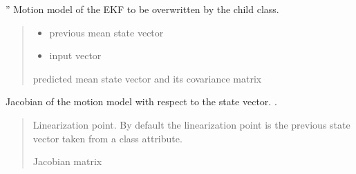 \documentclass[letterpaper,10pt,english]{sphinxmanual}
\begin{document}
\begin{fulllineitems}
\begin{fulllineitems}
\label{\detokenize{EKF:EKF.EKF.f}}
\pysigstartsignatures
{}
\pysigstopsignatures
\sphinxAtStartPar
”
Motion model of the EKF to be overwritten by the child class.
\begin{quote}\begin{description}
\begin{itemize}
\item {} 
\sphinxAtStartPar
{} \textendash{} previous mean state vector

\item {} 
\sphinxAtStartPar
{} \textendash{} input vector

\end{itemize}

\sphinxAtStartPar
predicted mean state vector and its covariance matrix

\end{description}\end{quote}

\end{fulllineitems}


\begin{fulllineitems}
\label{\detokenize{EKF:EKF.EKF.Jfx}}
\pysigstartsignatures
{}
\pysigstopsignatures
\sphinxAtStartPar
Jacobian of the motion model with respect to the state vector. .
\begin{quote}\begin{description}
\sphinxAtStartPar
{} \textendash{} Linearization point. By default the linearization point is the previous state vector taken from a class attribute.

\sphinxAtStartPar
Jacobian matrix

\end{description}\end{quote}


\end{fulllineitems}
\end{fulllineitems}
\end{document}
